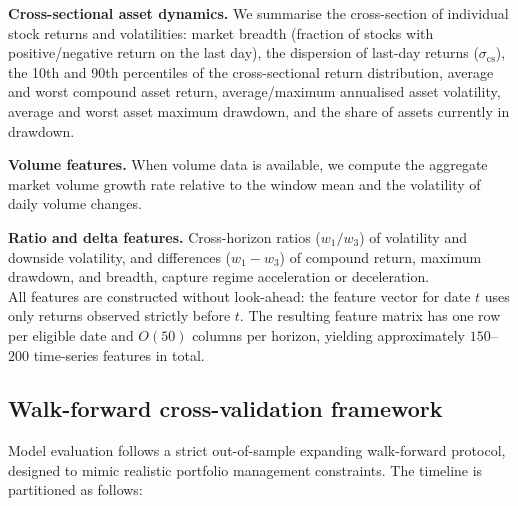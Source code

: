 \documentclass{article}
\begin{document}
\noindent\textbf{Cross-sectional asset dynamics.} We summarise the cross-section of individual stock returns and volatilities: market breadth (fraction of stocks with positive/negative return on the last day), the dispersion of last-day returns ($\sigma_{\text{cs}}$), the 10th and 90th percentiles of the cross-sectional return distribution, average and worst compound asset return, average/maximum annualised asset volatility, average and worst asset maximum drawdown, and the share of assets currently in drawdown.

\noindent\textbf{Volume features.} When volume data is available, we compute the aggregate market volume growth rate relative to the window mean and the volatility of daily volume changes.

\noindent\textbf{Ratio and delta features.} Cross-horizon ratios ($w_1 / w_3$) of volatility and downside volatility, and differences ($w_1 - w_3$) of compound return, maximum drawdown, and breadth, capture regime acceleration or deceleration.\\

All features are constructed without look-ahead: the feature vector for date $t$ uses only returns observed strictly before $t$. The resulting feature matrix has one row per eligible date and $O(50)$ columns per horizon, yielding approximately $150$--$200$ time-series features in total.

\subsection{Walk-forward cross-validation framework}
\label{sec:wfcv}

Model evaluation follows a strict out-of-sample expanding walk-forward protocol, designed to mimic realistic portfolio management constraints. The timeline is partitioned as follows:
\end{document}
